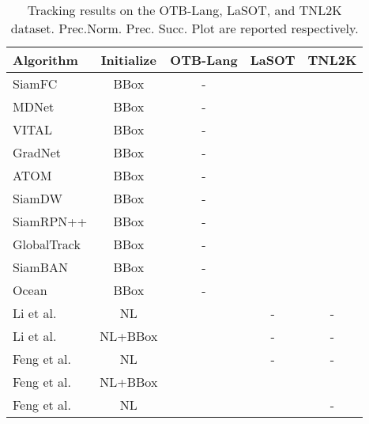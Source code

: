 \documentclass[final]{cvpr}
\begin{document}
\begin{table}
\center
\scriptsize 
\caption{Tracking results on the OTB-Lang, LaSOT, and TNL2K dataset. Prec.Norm. Prec. Succ. Plot are reported respectively.} \label{Benchmarkresults}
\begin{tabular}{l|c|c|c|c}
\hline \toprule [0.8 pt]
\textbf{Algorithm}    									&\textbf{Initialize}       		 &\textbf{OTB-Lang}      &\textbf{LaSOT}     			&\textbf{TNL2K}        \\
\hline 
SiamFC \cite{bertinetto2016siamfc} 			&BBox        			  	&-       						&      						&         			 \\	
MDNet \cite{Nam2015Learning} 					&BBox        			  	&-       						&      						&         			 \\	
VITAL \cite{SongYiBing_2018_CVPR} 		&BBox        			  	&-       						&      						&         			 \\	
GradNet \cite{Li_2019_ICCV} 					&BBox        			  	&-       						&      						&         			 \\	
ATOM \cite{danelljan2019atom} 					&BBox        			  	&-       						&      						&         			 \\	
SiamDW \cite{zhipeng2019deeper}				&BBox        			  	&-       						&      							&         			 \\		
SiamRPN++ \cite{li2018siamrpn++}			&BBox        			  	&-       						&      						&         			 \\		
GlobalTrack \cite{huang2019globaltrack}	&BBox        			  	&-       						&      						&         			 \\			
SiamBAN \cite{chen2020siamban} 				&BBox        			  	&-       						&      						&         			 \\	
Ocean \cite{zhang2020ocean} 						&BBox        			  	&-       						&      						&         			 \\
\hline \toprule [0.8 pt]
Li et al. \cite{li2017tracking}					&NL        			  	&       		&-     						&-        			 \\
Li et al. \cite{li2017tracking}					&NL+BBox        	&       		&-     						&-        			 \\
\hline 
Feng et al. \cite{feng2019robust} 			&NL        				&       		&-     						&-        			 \\
Feng et al. \cite{feng2019robust} 			&NL+BBox        	&       		&     		&        			 \\
\hline 
Feng et al. \cite{feng2020langTrackwacv}		&NL        				&       		&     		&-        			 \\

\end{tabular}
\end{table}
\end{document}
